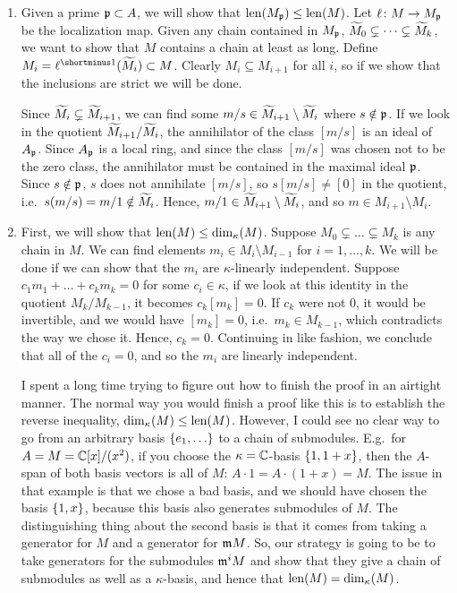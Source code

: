\begin{solution}
\begin{enumerate}
    \item Given a prime $\mathfrak{p} \subset A$, we will show that $\operatorname{len}(M_{\mathfrak{p}}) \leq \operatorname{len}(M)$. Let $\ell\colon M \to M_{\mathfrak{p}}$ be the localization map. Given any chain contained in $M_{\mathfrak{p}}$, $\widetilde{M}_0 \subsetneq \dots \subsetneq \widetilde{M}_k$, we want to show that $M$ contains a chain at least as long. Define $M_i = \ell\inv(\twiddle{M}_i) \subset M$. Clearly $M_i \subseteq M_{i+1}$ for all $i$, so if we show that the inclusions are strict we will be done. 
    
    Since $\widetilde{M}_i \subsetneq \widetilde{M}_{i+1}$, we can find some $m/s \in \widetilde{M}_{i+1} \setminus \widetilde{M}_i$ where $s \notin \mathfrak{p}$.  If we look in the quotient $\widetilde{M}_{i+1}/\widetilde{M}_i$, the annihilator of the class $[m/s]$ is an ideal of $A_{\mathfrak{p}}$. Since $A_{\mathfrak{p}}$ is a local ring, and since the class $[m/s]$ was chosen not to be the zero class, the annihilator must be contained in the maximal ideal $\mathfrak{p}$. Since $s \notin \mathfrak{p}$, $s$ does not annihilate $[m/s]$, so $s[m/s] \neq [0]$ in the quotient, i.e.\ $s(m/s) = m/1 \notin \widetilde{M}_i$. Hence, $m/1 \in \widetilde{M}_{i+1} \setminus \widetilde{M}_i$, and so $m \in M_{i+1} \setminus M_i$.

    \item First, we will show that $\operatorname{len}(M) \leq \dim_{\kappa}(M)$. Suppose $M_0 \subsetneq \dots \subsetneq M_k$ is any chain in $M$. We can find elements $m_i \in M_i \setminus M_{i-1}$ for $i = 1, \dots, k$. We will be done if we can show that the $m_i$ are $\kappa$-linearly independent. Suppose $c_1 m_1 + \dots + c_k m_k = 0$ for some $c_i \in \kappa$, if we look at this identity in the quotient $M_k/M_{k-1}$, it becomes $c_k [m_k] = 0$. If $c_k$ were not 0, it would be invertible, and we would have $[m_k] = 0$, i.e.\ $m_k \in M_{k-1}$, which contradicts the way we chose it. Hence, $c_k = 0$. Continuing in like fashion, we conclude that all of the $c_i = 0$, and so the $m_i$ are linearly independent.

    I spent a long time trying to figure out how to finish the proof in an airtight manner. The normal way you would finish a proof like this is to establish the reverse inequality, $\dim_{\kappa}(M) \leq \operatorname{len}(M)$. However, I could see no clear way to go from an arbitrary basis $\set{e_1,\dots}$ to a chain of submodules. E.g.\ for $A = M = \mathbb{C}[x]/(x^2)$, if you choose the $\kappa = \mathbb{C}$-basis $\{1,1+x\}$, then the $A$-span of both basis vectors is all of $M$: $A \cdot 1 = A \cdot (1+x) = M$. The issue in that example is that we chose a bad basis, and we should have chosen the basis $\{1,x\}$, because this basis also generates submodules of $M$. The distinguishing thing about the second basis is that it comes from taking a generator for $M$ and a generator for $\mathfrak{m}M$. So, our strategy is going to be to take generators for the submodules $\mathfrak{m}^i M$ and show that they give a chain of submodules as well as a $\kappa$-basis, and hence that $\operatorname{len}(M) = \dim_{\kappa}(M)$.


\end{enumerate}
\end{solution}

